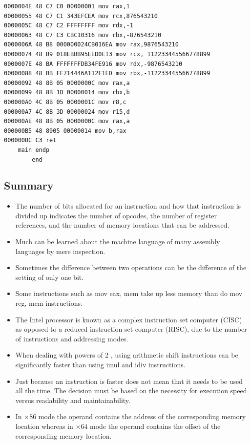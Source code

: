 \documentclass[10pt]{article}
\begin{document}
\begin{verbatim}
0000004E 48 C7 C0 00000001 mov rax,1
00000055 48 C7 C1 343EFCEA mov rcx,876543210
0000005C 48 C7 C2 FFFFFFFF mov rdx,-1
00000063 48 C7 C3 CBC10316 mov rbx,-876543210
0000006A 48 B8 000000024CB016EA mov rax,9876543210
00000074 48 B9 018EBBB95EED0E13 mov rcx, 112233445566778899
0000007E 48 BA FFFFFFFDB34FE916 mov rdx,-9876543210
00000088 48 BB FE714446A112F1ED mov rbx,-112233445566778899
00000092 48 8B 05 0000000C mov rax,a
00000099 48 8B 1D 00000014 mov rbx,b
000000A0 4C 8B 05 0000001C mov r8,c
000000A7 4C 8B 3D 00000024 mov r15,d
000000AE 48 8B 05 0000000C mov rax,a
000000B5 48 8905 00000014 mov b,rax
000000BC C3 ret
    main endp
        end
\end{verbatim}

\subsection*{Summary}
\begin{itemize}
  \item The number of bits allocated for an instruction and how that instruction is divided up indicates the number of opcodes, the number of register references, and the number of memory locations that can be addressed.
  \item Much can be learned about the machine language of many assembly languages by mere inspection.
  \item Sometimes the difference between two operations can be the difference of the setting of only one bit.
  \item Some instructions such as mov eax, mem take up less memory than do mov reg, mem instructions.
  \item The Intel processor is known as a complex instruction set computer (CISC) as opposed to a reduced instruction set computer (RISC), due to the number of instructions and addressing modes.
  \item When dealing with powers of 2 , using arithmetic shift instructions can be significantly faster than using imul and idiv instructions.
  \item Just because an instruction is faster does not mean that it needs to be used all the time. The decision must be based on the necessity for execution speed versus readability and maintainability.
  \item In $\times 86$ mode the operand contains the address of the corresponding memory location whereas in $\times 64$ mode the operand contains the offset of the corresponding memory location.
\end{itemize}
\end{document}

